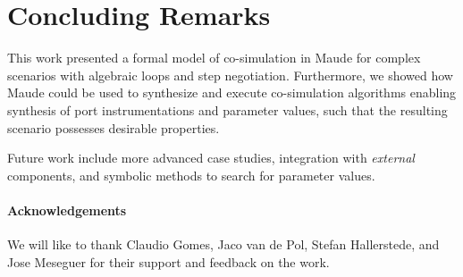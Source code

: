 \section{Concluding Remarks}\label{sc:summary}
This work presented a formal model of co-simulation in Maude for complex scenarios with algebraic loops and step negotiation.
Furthermore, we showed how Maude could be used to synthesize and execute co-simulation algorithms enabling synthesis of port instrumentations and parameter values, such that the resulting scenario possesses desirable properties.

Future work include more advanced case studies, integration with \emph{external} components, and symbolic methods to search for parameter values.

\paragraph{Acknowledgements}
We will like to thank Claudio Gomes, Jaco van de Pol, Stefan Hallerstede, and Jose Meseguer for their support and feedback on the work.
